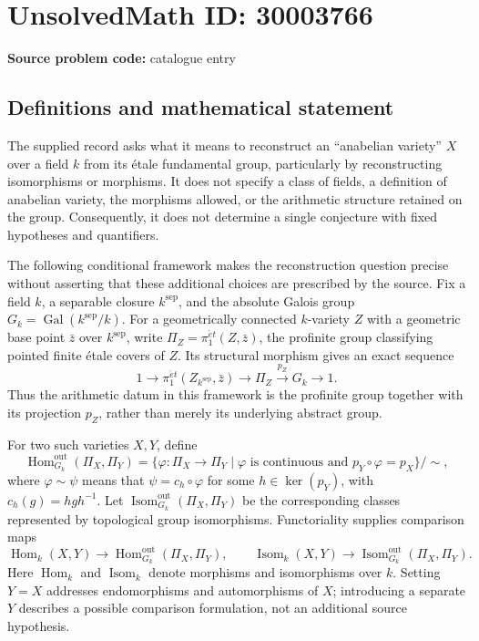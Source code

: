 \documentclass[11pt]{article}
\begin{document}
\section*{UnsolvedMath ID: 30003766}
\textbf{Source problem code:} catalogue entry
\subsection{Definitions and mathematical statement}
The supplied record asks what it means to reconstruct an ``anabelian variety'' \(X\) over a field \(k\) from its étale fundamental group, particularly by reconstructing isomorphisms or morphisms. It does not specify a class of fields, a definition of anabelian variety, the morphisms allowed, or the arithmetic structure retained on the group. Consequently, it does not determine a single conjecture with fixed hypotheses and quantifiers.

The following conditional framework makes the reconstruction question precise without asserting that these additional choices are prescribed by the source. Fix a field \(k\), a separable closure \(k^{\mathrm{sep}}\), and the absolute Galois group \(G_k=\operatorname{Gal}(k^{\mathrm{sep}}/k)\). For a geometrically connected \(k\)-variety \(Z\) with a geometric base point \(\bar z\) over \(k^{\mathrm{sep}}\), write \(\Pi_Z=\pi_1^{\acute{e}t}(Z,\bar z)\), the profinite group classifying pointed finite étale covers of \(Z\). Its structural morphism gives an exact sequence
\[
1\longrightarrow\pi_1^{\acute{e}t}(Z_{k^{\mathrm{sep}}},\bar z)\longrightarrow\Pi_Z\xrightarrow{p_Z}G_k\longrightarrow1.
\]
Thus the arithmetic datum in this framework is the profinite group together with its projection \(p_Z\), rather than merely its underlying abstract group.

For two such varieties \(X,Y\), define
\[
\operatorname{Hom}^{\mathrm{out}}_{G_k}(\Pi_X,\Pi_Y)
=\bigl\{\varphi:\Pi_X\to\Pi_Y\mid\varphi\text{ is continuous and }p_Y\circ\varphi=p_X\bigr\}/\sim,
\]
where \(\varphi\sim\psi\) means that \(\psi=c_h\circ\varphi\) for some \(h\in\ker(p_Y)\), with \(c_h(g)=hgh^{-1}\). Let \(\operatorname{Isom}^{\mathrm{out}}_{G_k}(\Pi_X,\Pi_Y)\) be the corresponding classes represented by topological group isomorphisms. Functoriality supplies comparison maps
\[
\operatorname{Hom}_k(X,Y)\longrightarrow\operatorname{Hom}^{\mathrm{out}}_{G_k}(\Pi_X,\Pi_Y),
\qquad
\operatorname{Isom}_k(X,Y)\longrightarrow\operatorname{Isom}^{\mathrm{out}}_{G_k}(\Pi_X,\Pi_Y).
\]
Here \(\operatorname{Hom}_k\) and \(\operatorname{Isom}_k\) denote morphisms and isomorphisms over \(k\). Setting \(Y=X\) addresses endomorphisms and automorphisms of \(X\); introducing a separate \(Y\) describes a possible comparison formulation, not an additional source hypothesis.
\end{document}
